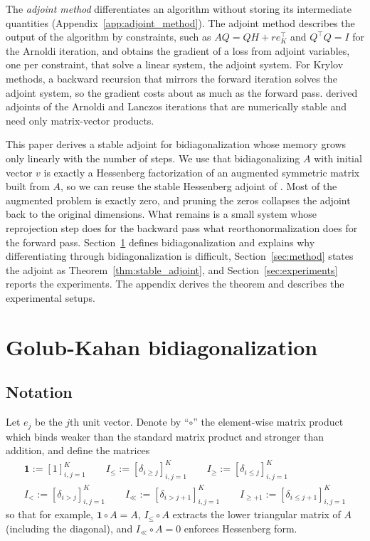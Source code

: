 \documentclass[a4paper,12pt]{article}
\theoremstyle{definition}
\begin{document}
The \emph{adjoint method} differentiates an algorithm without storing its intermediate quantities (Appendix~\ref{app:adjoint_method}). The adjoint method describes the output of the algorithm by constraints, such as $AQ = QH + re_K^\top$ and $Q^\top Q = I$ for the Arnoldi iteration, and obtains the gradient of a loss from adjoint variables, one per constraint, that solve a linear system, the adjoint system. For Krylov methods, a backward recursion that mirrors the forward iteration solves the adjoint system, so the gradient costs about as much as the forward pass. \citet{kraemer2024gradients} derived adjoints of the Arnoldi and Lanczos iterations that are numerically stable and need only matrix-vector products.

This paper derives a stable adjoint for bidiagonalization whose memory grows only linearly with the number of steps. We use that bidiagonalizing $A$ with initial vector $v$ is exactly a Hessenberg factorization of an augmented symmetric matrix built from $A$, so we can reuse the stable Hessenberg adjoint of \citet{kraemer2024gradients}. Most of the augmented problem is exactly zero, and pruning the zeros collapses the adjoint back to the original dimensions. What remains is a small system whose reprojection step does for the backward pass what reorthonormalization does for the forward pass. Section~\ref{sec:problem} defines bidiagonalization and explains why differentiating through bidiagonalization is difficult, Section~\ref{sec:method} states the adjoint as Theorem~\ref{thm:stable_adjoint}, and Section~\ref{sec:experiments} reports the experiments. The appendix derives the theorem and describes the experimental setups.

\section{Golub-Kahan bidiagonalization}\label{sec:problem}

\subsection{Notation}
Let $e_j$ be the $j$th unit vector. Denote by ``$\circ$'' the element-wise 
matrix product which binds weaker than the standard matrix product and stronger than addition, and define the matrices
\begin{gather*}
\mathbf{1} := [1]_{i,j=1}^K \qquad
I_{\leq} := [\delta_{i \geq j}]_{i,j=1}^K \qquad
I_{\geq} := [\delta_{i \leq j}]_{i,j=1}^K
\\
I_{<} := [\delta_{i > j}]_{i,j=1}^K \qquad
I_{\ll} := [\delta_{i > j+1}]_{i,j=1}^K \qquad
I_{\geq+1} := [\delta_{i \leq j+1}]_{i,j=1}^K
\end{gather*}
so that for example, $\mathbf{1} \circ A = A$, $I_{\leq} \circ A$ extracts the lower triangular matrix 
of $A$ (including the diagonal), and $I_{\ll} \circ A = 0$ enforces Hessenberg form.
\end{document}
